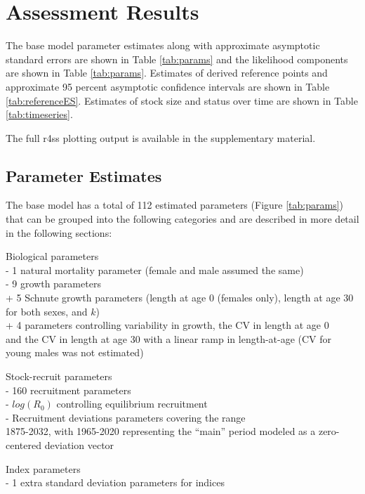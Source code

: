 \documentclass[
  english,
  a4paper,
]{article}
\begin{document}
\hypertarget{assessment-results}{%
\section{Assessment Results}\label{assessment-results}}

The base model parameter estimates along with approximate asymptotic standard errors are shown in Table \ref{tab:params} and the likelihood components are shown in Table \ref{tab:params}. Estimates of derived reference points and approximate 95 percent asymptotic confidence intervals are shown in Table \ref{tab:referenceES}. Estimates of stock size and status over time are shown in Table \ref{tab:timeseries}.

The full r4ss plotting output is available in the supplementary material.

\hypertarget{parameter-estimates}{%
\subsection{Parameter Estimates}\label{parameter-estimates}}

The base model has a total of 112 estimated parameters
(Figure \ref{tab:params}) that can be grouped into the following
categories and are described in more detail in the following sections:

Biological parameters\\
- 1 natural mortality parameter (female and male assumed the same)\\
- 9 growth parameters\\
+ 5 Schnute growth parameters (length at age 0 (females only), length at age 30 for both sexes, and \(k\))\\
+ 4 parameters controlling variability in growth, the CV in length at age 0\\
and the CV in length at age 30 with a linear ramp in length-at-age (CV for young males was not estimated)

Stock-recruit parameters\\
- 160 recruitment parameters\\
- \(log(R_0)\) controlling equilibrium recruitment\\
- Recruitment deviations parameters covering the range\\
1875-2032, with
1965-2020
representing the ``main'' period modeled as a zero-centered deviation vector

Index parameters\\
- 1 extra standard deviation parameters
for indices
\end{document}
